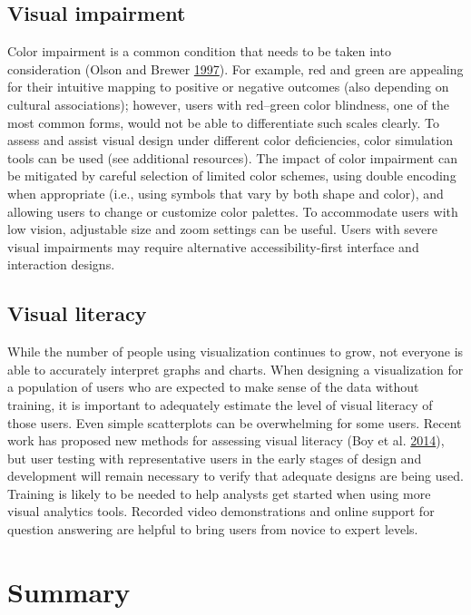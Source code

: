 \documentclass[]{krantz}
\begin{document}
\subsection{Visual impairment}\label{sec:viz-4.3}

Color impairment is a common condition that needs to be taken into
consideration (Olson and Brewer
\protect\hyperlink{ref-olson1997evaluation}{1997}). For example, red and
green are appealing for their intuitive mapping to positive or negative
outcomes (also depending on cultural associations); however, users with
red--green color blindness, one of the most common forms, would not be
able to differentiate such scales clearly. To assess and assist visual
design under different color deficiencies, color simulation tools can be
used (see additional resources). The impact of color impairment can be
mitigated by careful selection of limited color schemes, using double
encoding when appropriate (i.e., using symbols that vary by both shape
and color), and allowing users to change or customize color palettes. To
accommodate users with low vision, adjustable size and zoom settings can
be useful. Users with severe visual impairments may require alternative
accessibility-first interface and interaction designs.

\subsection{Visual literacy}\label{sec:viz-4.4}

While the number of people using visualization continues to grow, not
everyone is able to accurately interpret graphs and charts. When
designing a visualization for a population of users who are expected to
make sense of the data without training, it is important to adequately
estimate the level of visual literacy of those users. Even simple
scatterplots can be overwhelming for some users. Recent work has
proposed new methods for assessing visual literacy (Boy et al.
\protect\hyperlink{ref-boy2014principled}{2014}), but user testing with
representative users in the early stages of design and development will
remain necessary to verify that adequate designs are being used.
Training is likely to be needed to help analysts get started when using
more visual analytics tools. Recorded video demonstrations and online
support for question answering are helpful to bring users from novice to
expert levels.

\section{Summary}\label{sec:viz-5}
\end{document}
